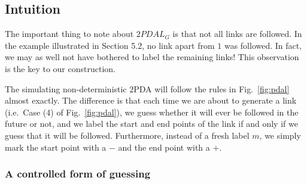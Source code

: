 
\subsection{Intuition}
The important thing to note about $2PDAL_G$ is that not all links
are followed. In the example illustrated in Section 5.2, no link
apart from $1$ was followed. In fact, we may as well not have
bothered to label the remaining links! This observation is the key
to our construction.

The simulating non-deterministic $2$PDA will follow the rules in
Fig.~\ref{fig:pdal} almost exactly. The difference is that each time
we are about to generate a link (i.e.~Case (4) of
Fig.~\ref{fig:pdal}), we guess whether it will ever be followed in the
future or not, and we label the start and end points of the link if
and only if we guess that it will be followed. Furthermore, instead of
a fresh label $m$, we simply mark the start point with a $-$ and the
end point with a $+$.


\subsubsection*{A controlled form of guessing}

